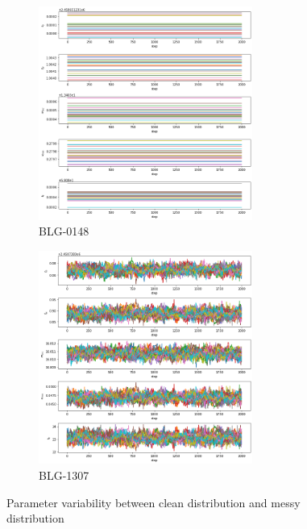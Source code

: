 \documentclass{article}
\begin{document}
        \begin{figure}[H]
            \begin{subfigure}{0.5\textwidth}
                \includegraphics[width=1\linewidth, height=7cm]{Images/2019-BLG-148_Walkers_Plot.png} 
                \caption{BLG-0148}
                \label{fig:Sub-Event-One-Main}
            \end{subfigure}
            \begin{subfigure}{0.5\textwidth}
                \includegraphics[width=1\linewidth, height=7cm]{Images/2019-BLG-1307_Walkers_Plot.png}
                \caption{BLG-1307}
                \label{fig:Sub-Event-One-Alt}
            \end{subfigure}
        \caption{Parameter variability between clean distribution and messy distribution}
        \label{fig:image2}
        \end{figure}
        
\end{document}
